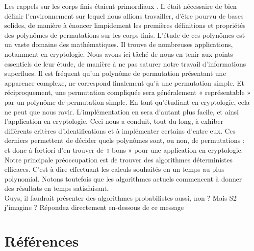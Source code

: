 \documentclass[12pt]{article}
\theoremstyle{definition}
\begin{document}
Les rappels sur les corps finis étaient primordiaux . Il était nécessaire de bien définir l'environnement sur lequel nous allions travailler, d’être pourvu de bases solides, de manière à énoncer limpidement les premières définitions et propriétés des polynômes de permutations sur les corps finis. L'étude de ces polynômes est un vaste domaine des mathématiques. Il trouve de nombreuses applications, notamment en cryptologie. Nous avons ici tâché de nous en tenir aux points essentiels de leur étude, de manière à ne pas saturer notre travail d’informations superflues. \newline
\break
Il est fréquent qu'un polynôme de permutation présentant une apparence complexe, ne correspond finalement qu’à une permutation simple. Et réciproquement, une permutation compliquée sera généralement « représentable » par un polynôme de permutation simple. En tant qu’étudiant en cryptologie, cela ne peut que nous ravir. L’implémentation en sera d’autant plus facile, et ainsi l’application en cryptologie. \newline
Ceci nous a conduit, tout du long, à exhiber différents critères d’identifications et à implémenter certains d’entre eux. Ces derniers permettent de décider quels polynômes sont, ou non, de permutations ; et donc à fortiori d'en trouver de « bons » pour une application en cryptologie. \newline
Notre principale préoccupation est de trouver des algorithmes déterministes efficaces.  C’est à dire effectuant les calculs souhaités en un temps au plus polynomial. Notons toutefois que les algorithmes actuels commencent à donner des résultats en temps satisfaisant.\\
{\color{red} Guys, il faudrait présenter des algorithmes probabilistes aussi, non ? Mais S2 j'imagine ?
Répondez directement en-dessous de ce message}

\pagebreak


\section*{Références}
\end{document}
